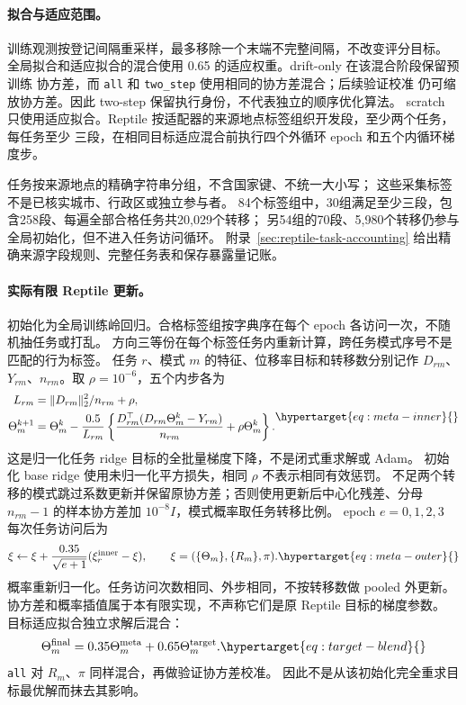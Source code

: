 \FloatBarrier
\paragraph{拟合与适应范围。}
训练观测按登记间隔重采样，最多移除一个末端不完整间隔，不改变评分目标。
全局拟合和适应拟合的混合使用 0.65 的适应权重。drift-only 在该混合阶段保留预训练
协方差，而 \texttt{all} 和 \texttt{two\_step} 使用相同的协方差混合；后续验证校准
仍可缩放协方差。因此 two-step 保留执行身份，不代表独立的顺序优化算法。
scratch 只使用适应拟合。Reptile 按适配器的来源地点标签组织开发段，至少两个任务，每任务至少
三段，在相同目标适应混合前执行四个外循环 epoch 和五个内循环梯度步。

任务按来源地点的精确字符串分组，不含国家键、不统一大小写；
这些采集标签不是已核实城市、行政区或独立参与者。
84个标签组中，30组满足至少三段，包含258段、每遍全部合格任务共20,029个转移；
另54组的70段、5,980个转移仍参与全局初始化，但不进入任务访问循环。
附录~\ref{sec:reptile-task-accounting} 给出精确来源字段规则、完整任务表和保存暴露量记账。

\paragraph{实际有限 Reptile 更新。}
初始化为全局训练岭回归。合格标签组按字典序在每个 epoch 各访问一次，不随机抽任务或打乱。
方向三等份在每个标签任务内重新计算，跨任务模式序号不是匹配的行为标签。
任务 \(r\)、模式 \(m\) 的特征、位移率目标和转移数分别记作
\(D_{rm}\)、\(Y_{rm}\)、\(n_{rm}\)。取 \(\rho=10^{-6}\)，五个内步各为
\begin{equation}
\begin{aligned}
L_{rm}&=\|D_{rm}\|_2^2/n_{rm}+\rho,\\
\Theta_m^{k+1}&=\Theta_m^k-\frac{0.5}{L_{rm}}
\left\{\frac{D_{rm}^{\top}(D_{rm}\Theta_m^k-Y_{rm})}{n_{rm}}
                 +\rho\Theta_m^k\right\}.
\end{aligned}
\label{eq:meta-inner}\hypertarget{eq:meta-inner}{}
\end{equation}
这是归一化任务 ridge 目标的全批量梯度下降，不是闭式重求解或 Adam。
初始化 base ridge 使用未归一化平方损失，相同 \(\rho\) 不表示相同有效惩罚。
不足两个转移的模式跳过系数更新并保留原协方差；否则使用更新后中心化残差、分母
\(n_{rm}-1\) 的样本协方差加 \(10^{-8}I\)，模式概率取任务转移比例。
epoch \(e=0,1,2,3\) 每次任务访问后为
\begin{equation}
\xi\leftarrow\xi+\frac{0.35}{\sqrt{e+1}}(\xi_r^{\rm inner}-\xi),
\qquad\xi=(\{\Theta_m\},\{R_m\},\pi).
\label{eq:meta-outer}\hypertarget{eq:meta-outer}{}
\end{equation}
概率重新归一化。任务访问次数相同、外步相同，不按转移数做 pooled 外更新。
协方差和概率插值属于本有限实现，不声称它们是原 Reptile 目标的梯度参数。
目标适应拟合独立求解后混合：
\begin{equation}
\Theta_m^{\rm final}=0.35\Theta_m^{\rm meta}+0.65\Theta_m^{\rm target}.
\label{eq:target-blend}\hypertarget{eq:target-blend}{}
\end{equation}
\texttt{all} 对 \(R_m\)、\(\pi\) 同样混合，再做验证协方差校准。
因此不是从该初始化完全重求目标最优解而抹去其影响。

